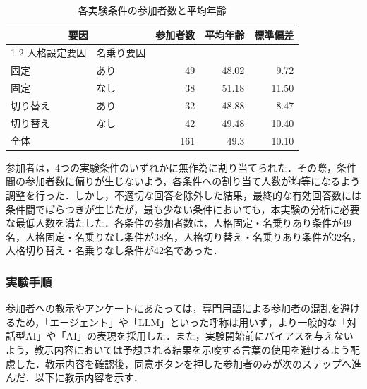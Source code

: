 \documentclass[10pt,twocolumn]{jsarticle}
\begin{document}
\begin{table}[htbp]
  \centering
  \caption{各実験条件の参加者数と平均年齢}
  \label{tab:pre_survey_stats_condition}
  \renewcommand{\arraystretch}{1.2}
  
  \begin{tabular}{llrrr}
    \hline
    \multicolumn{2}{c}{要因} & \multirow{2}{*}{参加者数} & \multirow{2}{*}{平均年齢} & \multirow{2}{*}{標準偏差} \\
    \cline{1-2}
    人格設定要因 & 名乗り要因 & & & \\
    \hline
    
    固定 & あり & 49 & 48.02 & 9.72 \\
    固定 & なし & 38 & 51.18 & 11.50 \\
    切り替え & あり & 32 & 48.88 & 8.47 \\
    切り替え & なし & 42 & 49.48 & 10.40 \\
    
    \hline
    \multicolumn{2}{l}{全体} & 161 & 49.3 & 10.10 \\
    \hline
  \end{tabular}
\end{table}



参加者は，4つの実験条件のいずれかに無作為に割り当てられた．その際，条件間の参加者数に偏りが生じないよう，各条件への割り当て人数が均等になるよう調整を行った．しかし，不適切な回答を除外した結果，最終的な有効回答数には条件間でばらつきが生じたが，最も少ない条件においても，本実験の分析に必要な最低人数を満たした．各条件の参加者数は，人格固定・名乗りあり条件が49名，人格固定・名乗りなし条件が38名，人格切り替え・名乗りあり条件が32名，人格切り替え・名乗りなし条件が42名であった．



\subsubsection{実験手順}
参加者への教示やアンケートにあたっては，専門用語による参加者の混乱を避けるため，「エージェント」や「LLM」といった呼称は用いず，より一般的な「対話型AI」や「AI」の表現を採用した．また，実験開始前にバイアスを与えないよう，教示内容においては予想される結果を示唆する言葉の使用を避けるよう配慮した．教示内容を確認後，同意ボタンを押した参加者のみが次のステップへ進んだ．以下に教示内容を示す．
\end{document}
